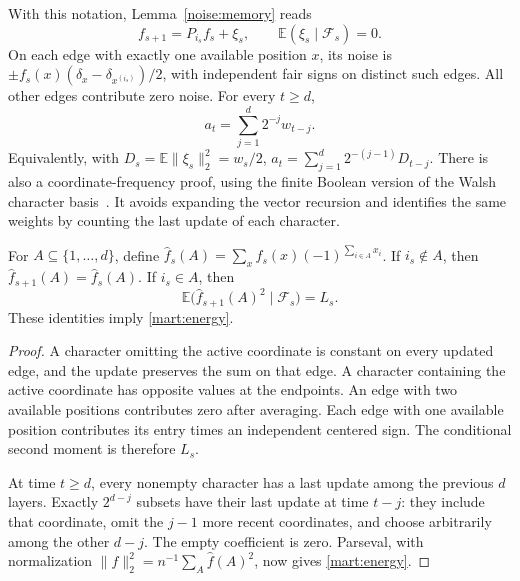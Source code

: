 With this notation, Lemma~\ref{noise:memory} reads
\begin{equation}\label{mart:noise-update}
 f_{s+1}=P_{i_s}f_s+\xi_s,\qquad
 \mathbb E(\xi_s\mid\mathcal F_s)=0.
\end{equation}
On each edge with exactly one available position $x$, its noise is
$\pm f_s(x)(\delta_x-\delta_{x^{(i_s)}})/2$, with independent fair
signs on distinct such edges.  All other edges contribute zero noise.
For every $t\ge d$,
\begin{equation}\label{mart:energy}
 a_t=\sum_{j=1}^d2^{-j}w_{t-j}.
\end{equation}
Equivalently, with $D_s=\mathbb E\|\xi_s\|_2^2=w_s/2$,
$a_t=\sum_{j=1}^d2^{-(j-1)}D_{t-j}$.
There is also a coordinate-frequency proof, using the finite Boolean version of the
Walsh character basis~\cite{walsh1923}. It avoids expanding the
vector recursion and identifies the same weights by counting the last
update of each character.

\begin{lemma}\label{mart:walsh}
For $A\subseteq\{1,\ldots,d\}$, define
$\widehat f_s(A)=\sum_xf_s(x)(-1)^{\sum_{i\in A}x_i}$.
If $i_s\notin A$, then $\widehat f_{s+1}(A)=\widehat f_s(A)$.
If $i_s\in A$, then
\begin{equation}\label{mart:walsh-update}
 \mathbb E\bigl(\widehat f_{s+1}(A)^2\mid\mathcal F_s\bigr)=L_s.
\end{equation}
These identities imply \eqref{mart:energy}.
\end{lemma}
\begin{proof}
A character omitting the active coordinate is constant on every
updated edge, and the update preserves the sum on that edge.  A
character containing the active coordinate has opposite values at
the endpoints.  An edge with two available positions contributes zero after averaging.
Each edge with one available position contributes its entry times an
independent centered sign. The conditional second moment is therefore $L_s$.

At time $t\ge d$, every nonempty character has a last update among the
previous $d$ layers.  Exactly $2^{d-j}$ subsets have their last update
at time $t-j$: they include that coordinate, omit the $j-1$ more
recent coordinates, and choose arbitrarily among the other $d-j$.
The empty coefficient is zero.  Parseval, with normalization
$\|f\|_2^2=n^{-1}\sum_A\widehat f(A)^2$, now gives
\eqref{mart:energy}.
\end{proof}

